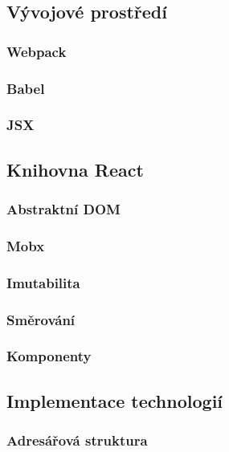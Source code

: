 \documentclass[a4paper,11pt,titlepage,fleqn]{article}
\begin{document}
    \subsection{Vývojové prostředí}
        \subsubsection{Webpack}

        \subsubsection{Babel}
        \subsubsection{JSX}


    \subsection{Knihovna React}
        
        \subsubsection{Abstraktní DOM}
        \subsubsection{Mobx}
        \subsubsection{Imutabilita}
        \subsubsection{Směrování}
        \subsubsection{Komponenty}


    \subsection{Implementace technologií}

        \subsubsection{Adresářová struktura}
        
\end{document}
